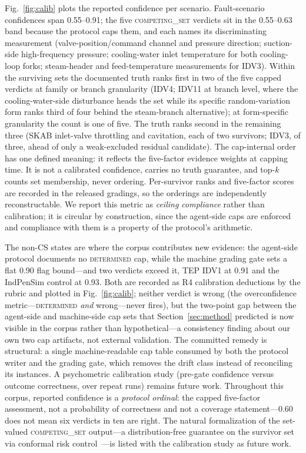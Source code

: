 \documentclass[preprint,10pt]{elsarticle}
\begin{document}
Fig.~\ref{fig:calib} plots the reported confidence per scenario. Fault-scenario confidences span 0.55--0.91; the five \mbox{\textsc{competing\_set}} verdicts sit in the 0.55--0.63 band because the protocol caps them, and each names its discriminating measurement (valve-position/command channel and pressure direction; suction-side high-frequency pressure; cooling-water inlet temperature for both cooling-loop forks; steam-header and feed-temperature measurements for IDV3). Within the surviving sets the documented truth ranks first in two of the five capped verdicts at family or branch granularity (IDV4; IDV11 at branch level, where the cooling-water-side disturbance heads the set while its specific random-variation form ranks third of four behind the steam-branch alternative); at form-specific granularity the count is one of five. The truth ranks second in the remaining three (SKAB inlet-valve throttling and cavitation, each of two survivors; IDV3, of three, ahead of only a weak-excluded residual candidate). The cap-internal order has one defined meaning: it reflects the five-factor evidence weights at capping time. It is not a calibrated confidence, carries no truth guarantee, and top-$k$ counts set membership, never ordering. Per-survivor ranks and five-factor scores are recorded in the released gradings, so the orderings are independently reconstructable. We report this metric as \emph{ceiling compliance} rather than calibration; it is circular by construction, since the agent-side caps are enforced and compliance with them is a property of the protocol's arithmetic.

The non-CS states are where the corpus contributes new evidence: the agent-side protocol documents no \mbox{\textsc{determined}} cap, while the machine grading gate sets a flat 0.90 flag bound---and two verdicts exceed it, TEP IDV1 at 0.91 and the IndPenSim control at 0.93. Both are recorded as R4 calibration deductions by the rubric and plotted in Fig.~\ref{fig:calib}; neither verdict is wrong (the overconfidence metric---\mbox{\textsc{determined}} \emph{and} wrong---never fires), but the two-point gap between the agent-side and machine-side cap sets that Section~\ref{sec:method} predicted is now visible in the corpus rather than hypothetical---a consistency finding about our own two cap artifacts, not external validation. The committed remedy is structural: a single machine-readable cap table consumed by both the protocol writer and the grading gate, which removes the drift class instead of reconciling its instances. A psychometric calibration study (pre-gate confidence versus outcome correctness, over repeat runs) remains future work. Throughout this corpus, reported confidence is a \emph{protocol ordinal}: the capped five-factor assessment, not a probability of correctness and not a coverage statement---$0.60$ does not mean six verdicts in ten are right. The natural formalization of the set-valued \mbox{\textsc{competing\_set}} output---a distribution-free guarantee on the survivor set via conformal risk control~\cite{angelopoulos2023conformal}---is listed with the calibration study as future work.
\end{document}
